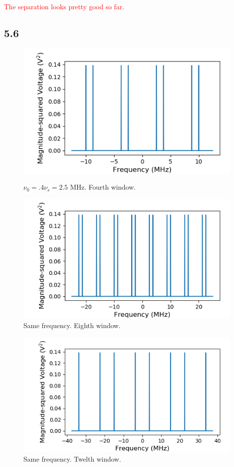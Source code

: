 \documentclass[a4paper]{article}
\begin{document}
\textcolor{red}{The separation looks pretty good so far.}

\subsection{5.6}

\begin{figure}
\centering
\begin{minipage}{.5\textwidth}
	\centering
	\includegraphics[width=.9\linewidth]{5-6/4window}
	\caption{$\nu_0 = .4 \nu_s = 2.5$ MHz. Fourth window.}
	\label{fig:win4}
\end{minipage}%
\begin{minipage}{.5\textwidth}
	\centering
	\includegraphics[width=.9\linewidth]{5-6/8window}
	\caption{Same frequency. Eighth window.}
	\label{fig:win8}
\end{minipage}
\end{figure}

\begin{figure}
\centering
\includegraphics[width=.45\linewidth]{5-6/12window}
\caption{Same frequency. Twelth window.}
\label{fig:win12}
\end{figure}
\end{document}
